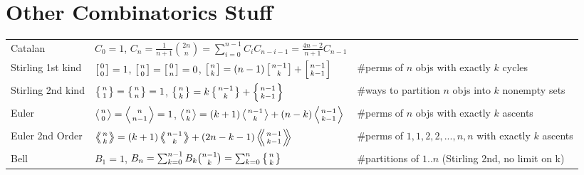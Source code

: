 \section{Other Combinatorics Stuff}
  \begin{tabular}{@{}l|l|l@{}}
  \toprule
  Catalan	&	$C_0=1$, $C_n=\frac{1}{n+1}\binom{2n}{n} = \sum_{i=0}^{n-1}C_iC_{n-i-1} = \frac{4n-2}{n+1}C_{n-1}$  & \\
  Stirling 1st kind & $\left[{0\atop 0}\right]=1$, $\left[{n\atop 0}\right]=\left[{0\atop n}\right]=0$, $\left[{n\atop k}\right]=(n-1)\left[{n-1\atop k}\right]+\left[{n-1\atop k-1}\right]$ & \#perms of $n$ objs with exactly $k$ cycles\\
  Stirling 2nd kind & $\left\{{n\atop 1}\right\}=\left\{{n\atop n}\right\}=1$, $\left\{{n\atop k}\right\} = k \left\{{ n-1 \atop k }\right\} + \left\{{n-1\atop k-1}\right\}$ & \#ways to partition $n$ objs into $k$ nonempty sets\\
  Euler	& $\left \langle {n\atop 0} \right \rangle = \left \langle {n\atop n-1} \right \rangle = 1 $, $\left \langle {n\atop k} \right \rangle = (k+1) \left \langle {n-1\atop {k}} \right \rangle + (n-k)\left \langle {{n-1}\atop {k-1}} \right \rangle$ & \#perms of $n$ objs with exactly $k$ ascents \\
  Euler 2nd Order &  $\left \langle \!\!\left \langle {n\atop k} \right \rangle \!\! \right \rangle = (k+1) \left \langle \!\! \left \langle {{n-1}\atop {k}} \right \rangle \!\! \right \rangle +(2n-k-1)\left \langle \!\! \left \langle {{n-1}\atop {k-1}} \right \rangle  \!\! \right \rangle$ & \#perms of ${1,1,2,2,...,n,n}$ with exactly $k$ ascents \\
  Bell & $B_1 = 1$, $B_n = \sum_{k=0}^{n-1} B_k \binom{n-1}{k} = \sum_{k=0}^n\left\{{n\atop k}\right\}$ & \#partitions of $1..n$ (Stirling 2nd, no limit on k)\\
  \bottomrule
  \end{tabular}

